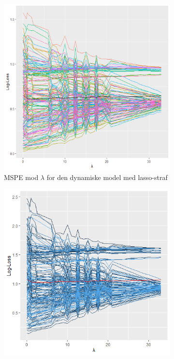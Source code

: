 \documentclass[11pt,a4paper]{article}
\begin{document}
\begin{figure}[h!]
  \centering
  \begin{subfigure}[b]{0.425\linewidth}
    \includegraphics[width=\textwidth]{MSPEDYNLINE.png}
    \caption{MSPE mod $\lambda$ for den dynamiske model med lasso-straf}
    \label{fig:DynMSPELine}
  \end{subfigure}
  \begin{subfigure}[b]{0.425\linewidth}
\includegraphics[width=\textwidth]{LOGLOSSDYNLINE.png}

\end{subfigure}
\end{figure}
\end{document}
